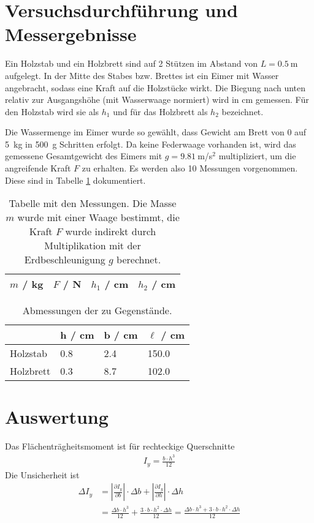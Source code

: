 \documentclass{article}
\begin{document}
\newpage
\section{Versuchsdurchführung und Messergebnisse}

Ein Holzstab und ein Holzbrett sind auf 2 Stützen im Abstand von $L=0.5~$m aufgelegt. In der Mitte des Stabes bzw. Brettes ist ein Eimer mit Wasser angebracht, sodass eine Kraft auf die Holzstücke wirkt. Die Biegung nach unten relativ zur Ausgangshöhe (mit Wasserwaage normiert) wird in cm gemessen. Für den Holzstab wird sie als $h_1$ und für das Holzbrett als $h_2$ bezeichnet.

Die Wassermenge im Eimer wurde so gewählt, dass Gewicht am Brett von 0 auf 5~kg in 500~g Schritten erfolgt. Da keine Federwaage vorhanden ist, wird das gemessene Gesamtgewicht des Eimers mit $g=9.81~$m/s${}^2$ multipliziert, um die angreifende Kraft $F$ zu erhalten. Es werden also 10 Messungen vorgenommen. Diese sind in Tabelle \ref{tab:messungen} dokumentiert.


\begin{table}[H]
\caption{Tabelle mit den Messungen. Die Masse $m$ wurde mit einer Waage bestimmt, die Kraft $F$ wurde indirekt durch Multiplikation mit der Erdbeschleunigung $g$ berechnet.}
\label{tab:messungen}


\begin{tabular}{ll|ll}
$m$ / kg & $F$ / N & $h_1$ / cm & $h_2$ / cm\\
\hline

\end{tabular}

\end{table}

\begin{table}[H]
\caption{Abmessungen der zu Gegenstände.}
\begin{tabular}{l|lll}
& h / cm & b / cm & $\ell$ / cm \\
\hline
Holzstab & 0.8 & 2.4  &  150.0 \\
Holzbrett & 0.3 & 8.7 & 102.0
\end{tabular}
\end{table}






\newpage
\section{Auswertung}

Das Flächenträgheitsmoment ist für rechteckige Querschnitte 
\begin{align}
I_y = \frac{b\cdot h^3}{12}
\end{align}
Die Unsicherheit ist
\begin{align}
\Delta I_y &= \left| \frac{\partial I_y}{\partial b}\right| \cdot \Delta b + \left| \frac{ \partial I_y}{\partial h} \right| \cdot \Delta h \\
&= \frac{\Delta b\cdot h^3}{12} + \frac{3\cdot b\cdot h^2 \cdot \Delta h}{12} = \frac{\Delta b \cdot h^3 + 3\cdot b \cdot h^2 \cdot \Delta h}{12}
\end{align}
\end{document}
